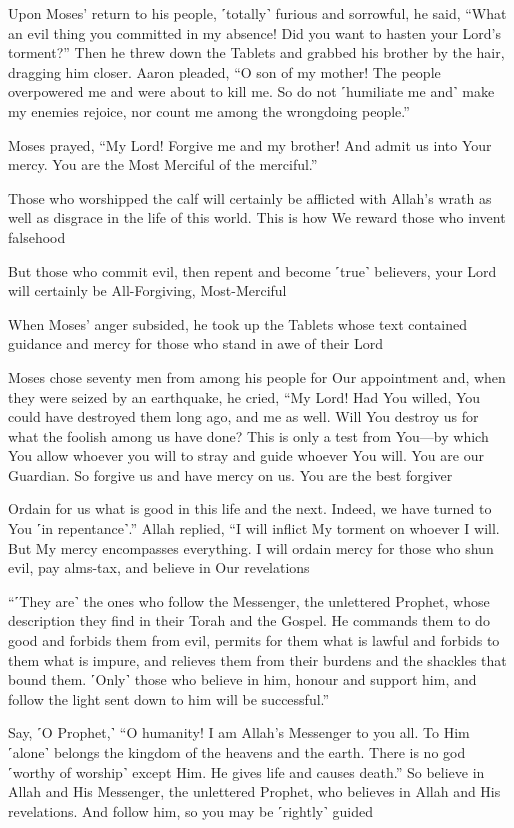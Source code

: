 Upon Moses’ return to his people, ˹totally˺ furious and sorrowful, he said, “What an evil thing you committed in my absence! Did you want to hasten your Lord’s torment?” Then he threw down the Tablets and grabbed his brother by the hair, dragging him closer. Aaron pleaded, “O son of my mother! The people overpowered me and were about to kill me. So do not ˹humiliate me and˺ make my enemies rejoice, nor count me among the wrongdoing people.”

Moses prayed, “My Lord! Forgive me and my brother! And admit us into Your mercy. You are the Most Merciful of the merciful.”

Those who worshipped the calf will certainly be afflicted with Allah’s wrath as well as disgrace in the life of this world. This is how We reward those who invent falsehood

But those who commit evil, then repent and become ˹true˺ believers, your Lord will certainly be All-Forgiving, Most-Merciful

When Moses’ anger subsided, he took up the Tablets whose text contained guidance and mercy for those who stand in awe of their Lord

Moses chose seventy men from among his people for Our appointment and, when they were seized by an earthquake, he cried, “My Lord! Had You willed, You could have destroyed them long ago, and me as well. Will You destroy us for what the foolish among us have done? This is only a test from You—by which You allow whoever you will to stray and guide whoever You will. You are our Guardian. So forgive us and have mercy on us. You are the best forgiver

Ordain for us what is good in this life and the next. Indeed, we have turned to You ˹in repentance˺.” Allah replied, “I will inflict My torment on whoever I will. But My mercy encompasses everything. I will ordain mercy for those who shun evil, pay alms-tax, and believe in Our revelations

“˹They are˺ the ones who follow the Messenger, the unlettered Prophet, whose description they find in their Torah and the Gospel. He commands them to do good and forbids them from evil, permits for them what is lawful and forbids to them what is impure, and relieves them from their burdens and the shackles that bound them. ˹Only˺ those who believe in him, honour and support him, and follow the light sent down to him will be successful.”

Say, ˹O Prophet,˺ “O humanity! I am Allah’s Messenger to you all. To Him ˹alone˺ belongs the kingdom of the heavens and the earth. There is no god ˹worthy of worship˺ except Him. He gives life and causes death.” So believe in Allah and His Messenger, the unlettered Prophet, who believes in Allah and His revelations. And follow him, so you may be ˹rightly˺ guided

